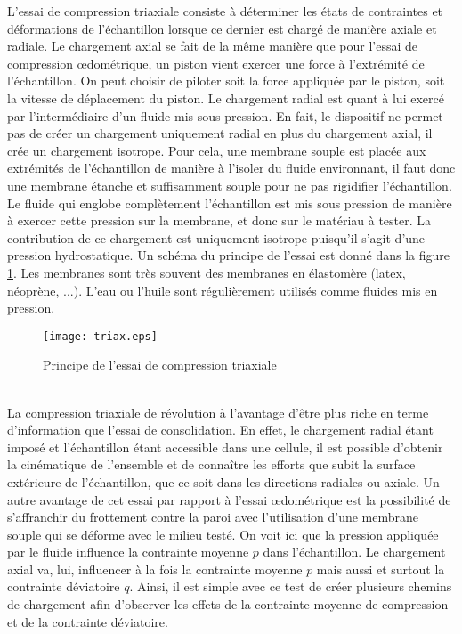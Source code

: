 				\indent L'essai de compression triaxiale consiste à déterminer les états de contraintes et déformations de l'échantillon lorsque ce dernier est chargé de manière axiale et radiale. Le chargement axial se fait de la même manière que pour l'essai de compression \oe{}dométrique, un piston vient exercer une force à l'extrémité de l'échantillon. On peut choisir de piloter soit la force appliquée par le piston, soit la vitesse de déplacement du piston. Le chargement radial est quant à lui exercé par l'intermédiaire d'un fluide mis sous pression. En fait, le dispositif ne permet pas de créer un chargement uniquement radial en plus du chargement axial, il crée un chargement isotrope. Pour cela, une membrane souple est placée aux extrémités de l'échantillon de manière à l'isoler du fluide environnant, il faut donc une membrane étanche et suffisamment souple pour ne pas rigidifier l'échantillon. Le fluide qui englobe complètement l'échantillon est mis sous pression de manière à exercer cette pression sur la membrane, et donc sur le matériau à tester. La contribution de ce chargement est uniquement isotrope puisqu'il s'agit d'une pression hydrostatique. Un schéma du principe de l'essai est donné dans la figure \ref{fig03:triax}. Les membranes sont très souvent des membranes en élastomère (latex, néoprène, ...). L'eau ou l'huile sont régulièrement utilisés comme fluides mis en pression.
				\begin{figure}\centering
					\texttt{[image: triax.eps]}
					\caption{\label{fig03:triax}Principe de l'essai de compression triaxiale}
				\end{figure}
				\\La compression triaxiale de révolution à l'avantage d'être plus riche en terme d'information que l'essai de consolidation. En effet, le chargement radial étant imposé et l'échantillon étant accessible dans une cellule, il est possible d'obtenir la cinématique de l'ensemble et de connaître les efforts que subit la surface extérieure de l'échantillon, que ce soit dans les directions radiales ou axiale. Un autre avantage de cet essai par rapport à l'essai \oe{}dométrique est la possibilité de s'affranchir du frottement contre la paroi avec l'utilisation d'une membrane souple qui se déforme avec le milieu testé. On voit ici que la pression appliquée par le fluide influence la contrainte moyenne $p$ dans l'échantillon. Le chargement axial va, lui, influencer à la fois la contrainte moyenne $p$ mais aussi et surtout la contrainte déviatoire $q$. Ainsi, il est simple avec ce test de créer plusieurs chemins de chargement afin d'observer les effets de la contrainte moyenne de compression et de la contrainte déviatoire.
